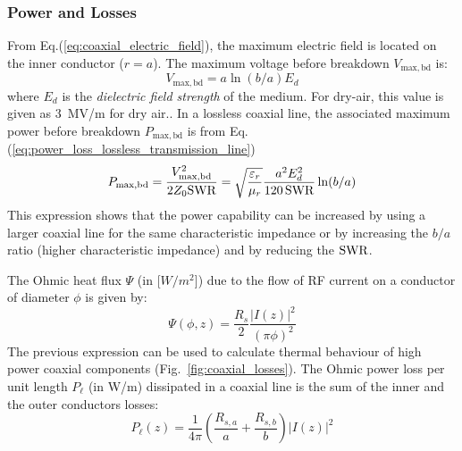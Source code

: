 \subsubsection{Power and Losses}
From Eq.(\ref{eq:coaxial_electric_field}), the maximum electric field is located on the inner conductor ($r=a$). The maximum voltage before breakdown $V_{\mathrm{max,bd}}$ is:
\begin{equation}
	V_{\mathrm{max,bd}} = a\ln\left(b/a\right) E_d
\end{equation}
where $E_d$ is the \textit{dielectric field strength} of the medium. For dry-air, this value is given as $3$~\si{MV/m} for dry air\cite[b§3.11]{pozar2012}.. In a lossless coaxial line, the associated maximum power before breakdown $P_\mathrm{max,bd}$ is from Eq.(\ref{eq:power_loss_lossless_transmission_line})
\begin{equation}
	P_\mathrm{max,bd} =  \frac{V^2_{\mathrm{max,bd}} }{2 Z_0 {\mathrm{SWR}}}= \sqrt{\frac{\varepsilon_{r}}{\mu_r}} \frac{a^2 E_d^2}{120\,{\mathrm{SWR}}} \ln (b/a)
\end{equation}
This expression shows that the power capability can be increased by using a larger coaxial line for the same characteristic impedance or by increasing the $b/a$ ratio (higher characteristic impedance) and by reducing the ${\mathrm{SWR}}$.

The Ohmic heat flux $\Psi$ (in [$\si{W/m^2}$]) due to the flow of RF current on a conductor of diameter $\phi$ is given by:
\begin{equation}
\Psi(\phi,z) 
=
\frac{R_s}{2}
\frac{|I(z)|^2}{(\pi \phi)^2}
\label{eq:ohmic_heat_flux_coaxial}
\end{equation}
The previous expression can be used to calculate thermal behaviour of high power coaxial components (Fig.~\ref{fig:coaxial_losses}). The Ohmic power loss per unit length $P_\ell$ (in \si{W/m}) dissipated in a coaxial line is the sum of the inner and the outer conductors losses:
\begin{equation}
P_\ell (z)
=
\frac{1}{4 \pi}
\left(
\frac{R_{s,a}}{a} + \frac{R_{s,b}}{b}
\right)
|I(z)|^2
\end{equation}


